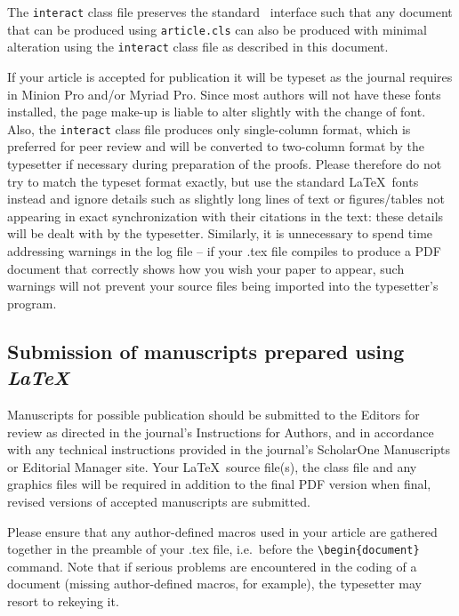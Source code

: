 \documentclass[]{interact}
\theoremstyle{plain}%
\theoremstyle{definition}
\theoremstyle{remark}
\begin{document}
The \texttt{interact} class file preserves the standard \LaTeXe~interface such that any document that can be produced using \texttt{article.cls} can also be produced with minimal alteration using the \texttt{interact} class file as described in this document.

If your article is accepted for publication it will be typeset as the journal requires in Minion Pro and/or Myriad Pro. Since most authors will not have these fonts installed, the page make-up is liable to alter slightly with the change of font. Also, the \texttt{interact} class file produces only single-column format, which is preferred for peer review and will be converted to two-column format by the typesetter if necessary during preparation of the proofs. Please therefore do not try to match the typeset format exactly, but use the standard \LaTeX~fonts instead and ignore details such as slightly long lines of text or figures/tables not appearing in exact synchronization with their citations in the text: these details will be dealt with by the typesetter. Similarly, it is unnecessary to spend time addressing warnings in the log file -- if your .tex file compiles to produce a PDF document that correctly shows how you wish your paper to appear, such warnings will not prevent your source files being imported into the typesetter's program.

\hypertarget{submission-of-manuscripts-prepared-using}{%
\subsection{\texorpdfstring{Submission of manuscripts prepared using \emph{\LaTeX}}{Submission of manuscripts prepared using }}\label{submission-of-manuscripts-prepared-using}}

Manuscripts for possible publication should be submitted to the Editors for review as directed in the journal's Instructions for Authors, and in accordance with any technical instructions provided in the journal's ScholarOne Manuscripts or Editorial Manager site. Your \LaTeX~source file(s), the class file and any graphics files will be required in addition to the final PDF version when final, revised versions of accepted manuscripts are submitted.

Please ensure that any author-defined macros used in your article are gathered together in the preamble of your .tex file, i.e.~before the \texttt{\textbackslash{}begin\{document\}} command. Note that if serious problems are encountered in the coding of a document (missing author-defined macros, for example), the typesetter may resort to rekeying it.
\end{document}
